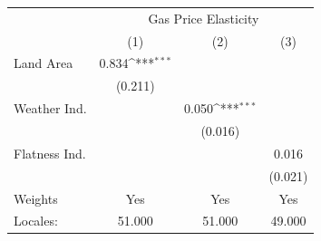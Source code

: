 {
\def\sym#1{\ifmmode^{#1}\else\(^{#1}\)\fi}
\begin{tabular}{l*{3}{c}}
\hline\hline
            &\multicolumn{3}{c}{Gas Price Elasticity}                         \\
            &\multicolumn{1}{c}{(1)}         &\multicolumn{1}{c}{(2)}         &\multicolumn{1}{c}{(3)}         \\
\hline
Land Area   &       0.834\sym{***}&                     &                     \\
            &     (0.211)         &                     &                     \\
[1em]
Weather Ind.&                     &       0.050\sym{***}&                     \\
            &                     &     (0.016)         &                     \\
[1em]
Flatness Ind.&                     &                     &       0.016         \\
            &                     &                     &     (0.021)         \\
\hline
Weights     &         Yes         &         Yes         &         Yes         \\
Locales:    &      51.000         &      51.000         &      49.000         \\
\hline\hline
\end{tabular}
}
